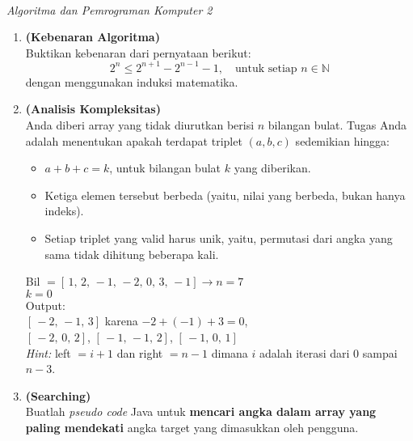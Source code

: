 \documentclass[12pt]{article}
\begin{document}
\begin{center}
     \\
    \textit{Algoritma dan Pemrograman Komputer 2} \\
\end{center}

\vspace{0.5cm}

\begin{enumerate}
    \item \textbf{(Kebenaran Algoritma)} \\
    Buktikan kebenaran dari pernyataan berikut:
    \[
        2^n \leq 2^{n+1} - 2^{n-1} - 1, \quad \text{untuk setiap } n \in \mathbb{N}
    \]
    dengan menggunakan induksi matematika.

    \item \textbf{(Analisis Kompleksitas)} \\
    Anda diberi array yang tidak diurutkan berisi $n$ bilangan bulat. Tugas Anda adalah menentukan apakah terdapat triplet $(a, b, c)$ sedemikian hingga:
    \begin{itemize}
        \item $a + b + c = k$, untuk bilangan bulat $k$ yang diberikan.
        \item Ketiga elemen tersebut berbeda (yaitu, nilai yang berbeda, bukan hanya indeks).
        \item Setiap triplet yang valid harus unik, yaitu, permutasi dari angka yang sama tidak dihitung beberapa kali.
    \end{itemize}
    \begin{tcolorbox}[title=Contoh]
    Bil $= [\, 1,\, 2,\, -1,\, -2,\, 0,\, 3,\, -1] \rightarrow n = 7$ \\
    $k = 0$ \\
    Output: \\
    $[\, -2,\, -1,\, 3]$ karena $-2 + (-1) + 3 = 0$, \\
    $[\, -2,\, 0,\, 2]$, $[\,-1,\, -1,\, 2]$, $[\,-1,\, 0,\, 1]$ \\
    \textit{Hint:} left $= i+1$ dan right $= n-1$ dimana $i$ adalah iterasi dari 0 sampai $n-3$.
    \end{tcolorbox}

    \item \textbf{(Searching)} \\
    Buatlah \textit{pseudo code} Java untuk \textbf{mencari angka dalam array yang paling mendekati} angka target yang dimasukkan oleh pengguna.


\end{enumerate}
\end{document}
